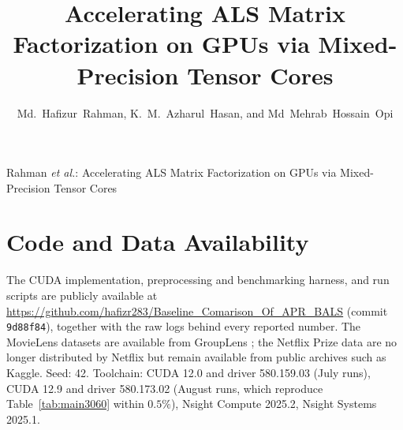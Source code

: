 \documentclass[10pt,journal,compsoc]{IEEEtran}
\begin{document}
\title{Accelerating ALS Matrix Factorization on GPUs via Mixed-Precision Tensor Cores}

\author{Md.~Hafizur~Rahman, K.~M.~Azharul~Hasan, and Md~Mehrab~Hossain~Opi
}

%
{Rahman \MakeLowercase{\textit{et al.}}: Accelerating ALS Matrix Factorization on GPUs via Mixed-Precision Tensor Cores}


\maketitle
\IEEEdisplaynontitleabstractindextext
\IEEEpeerreviewmaketitle









\section*{Code and Data Availability}
The CUDA implementation, preprocessing and benchmarking harness, and run scripts are publicly available at \url{https://github.com/hafizr283/Baseline_Comarison_Of_APR_BALS} (commit \texttt{9d88f84}), together with the raw logs behind every reported number. The MovieLens datasets are available from GroupLens \cite{harper2016movielens}; the Netflix Prize data \cite{bennett2007netflix} are no longer distributed by Netflix but remain available from public archives such as Kaggle. Seed: 42. Toolchain: CUDA 12.0 and driver 580.159.03 (July runs), CUDA 12.9 and driver 580.173.02 (August runs, which reproduce Table~\ref{tab:main3060} within $0.5\%$), Nsight Compute 2025.2, Nsight Systems 2025.1.
\end{document}
